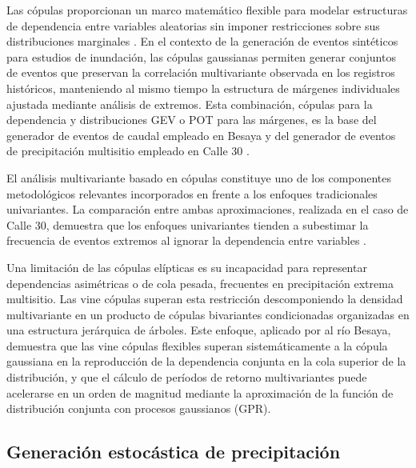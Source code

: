 Las cópulas proporcionan un marco matemático flexible para modelar estructuras de dependencia entre variables aleatorias sin imponer restricciones sobre sus distribuciones marginales \parencite{genest2007copulas,salvadori2004copulas,salvadori2007extremes}. En el contexto de la generación de eventos sintéticos para estudios de inundación, las cópulas gaussianas permiten generar conjuntos de eventos que preservan la correlación multivariante observada en los registros históricos, manteniendo al mismo tiempo la estructura de márgenes individuales ajustada mediante análisis de extremos. Esta combinación, cópulas para la dependencia y distribuciones GEV o POT para las márgenes, es la base del generador de eventos de caudal empleado en Besaya y del generador de eventos de precipitación multisitio empleado en Calle 30 \parencite{navas2018besaya,navas2024calle30}.

El análisis multivariante basado en cópulas constituye uno de los componentes metodológicos relevantes incorporados en \pyhydra frente a los enfoques tradicionales univariantes. La comparación entre ambas aproximaciones, realizada en el caso de Calle 30, demuestra que los enfoques univariantes tienden a subestimar la frecuencia de eventos extremos al ignorar la dependencia entre variables \parencite{navas2024calle30}.

Una limitación de las cópulas elípticas es su incapacidad para representar dependencias asimétricas o de cola pesada, frecuentes en precipitación extrema multisitio. Las vine cópulas \parencite{aas2009vines} superan esta restricción descomponiendo la densidad multivariante en un producto de cópulas bivariantes condicionadas organizadas en una estructura jerárquica de árboles. Este enfoque, aplicado por \textcite{urrea2026vine} al río Besaya, demuestra que las vine cópulas flexibles superan sistemáticamente a la cópula gaussiana en la reproducción de la dependencia conjunta en la cola superior de la distribución, y que el cálculo de períodos de retorno multivariantes puede acelerarse en un orden de magnitud mediante la aproximación de la función de distribución conjunta con procesos gaussianos (GPR).

\subsection{Generación estocástica de precipitación}
\label{sec:generacion_estocastica}

